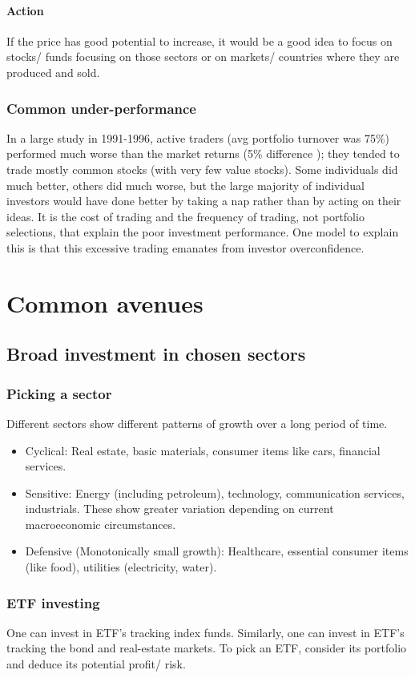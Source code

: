 \documentclass[oneside, article]{memoir}
\begin{document}
\paragraph{Action}
If the price has good potential to increase, it would be a good idea to focus on stocks/ funds focusing on those sectors or on markets/ countries where they are produced and sold.

\subsubsection{Common under-performance}
In a large study in 1991-1996, active traders (avg portfolio turnover was 75\%) performed much worse than the market returns (5\% difference ); they tended to trade mostly common stocks (with very few value stocks). Some individuals did much better, others did much worse, but the large majority of individual investors would have done better by taking a nap rather than by acting on their ideas. It is the cost of trading and the frequency of trading, not portfolio selections, that explain the poor investment performance. One model to explain this is that this excessive trading emanates from investor overconfidence.


\section{Common avenues}
\subsection{Broad investment in chosen sectors}
\subsubsection{Picking a sector}
Different sectors show different patterns of growth over a long period of time.
\begin{itemize}
 \item Cyclical: Real estate, basic materials, consumer items like cars, financial services.
 \item Sensitive: Energy (including petroleum), technology, communication services, industrials. These show greater variation depending on current macroeconomic circumstances.
 \item Defensive (Monotonically small growth): Healthcare, essential consumer items (like food), utilities (electricity, water).
\end{itemize}

\subsubsection{ETF investing}
One can invest in ETF's tracking index funds. Similarly, one can invest in ETF's tracking the bond and real-estate markets. To pick an ETF, consider its portfolio and deduce its potential profit/ risk.
\end{document}
